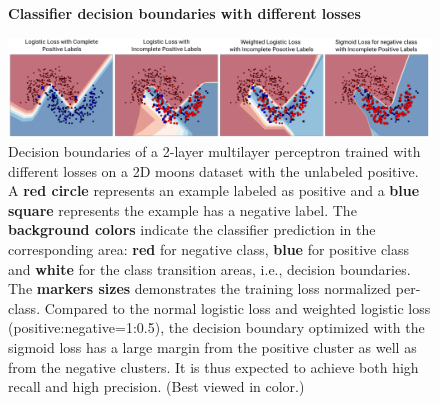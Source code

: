 \begin{figure}
\begin{center}
\textbf{Classifier decision boundaries with different losses}\par\medskip
   \includegraphics[width=0.95\linewidth]{img/moons.pdf}
\end{center}
   \caption{
   Decision boundaries of a 2-layer multilayer perceptron trained with different losses on a 2D moons dataset with the unlabeled positive.
   A \textbf{red circle} represents an example labeled as positive and a \textbf{blue square} represents the example has a negative label.
   The \textbf{background colors} indicate the classifier prediction in the corresponding area: \textbf{red} for negative class, \textbf{blue} for positive class and \textbf{white} for the class transition areas, i.e., decision boundaries.
   The \textbf{markers sizes} demonstrates the training loss normalized per-class.
   Compared to the normal logistic loss and weighted logistic loss (positive:negative=1:0.5), the decision boundary optimized with the sigmoid loss has a large margin from the positive cluster as well as from the negative clusters.
   It is thus expected to achieve both high recall and high precision.
   (Best viewed in color.)
   }
\label{fig:moons}
\end{figure}


